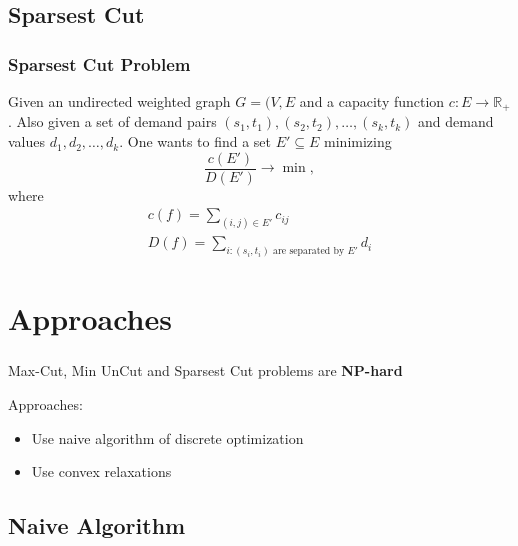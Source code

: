 \documentclass[10pt]{beamer}
\begin{document}
	\subsection{Sparsest Cut}
	
		\begin{frame}
			\frametitle{Sparsest Cut Problem}
			
			Given an undirected weighted graph $G = (V, E$ and a capacity function $c 
			: E \rightarrow \mathbb R_+$.
			Also given a set of demand pairs $(s_1, t_1), (s_2, t_2), \dots, (s_k, t_k)$ and 
			demand values $d_1, d_2, \dots, d_k$.
			One wants to find a set $E' \subseteq E$ minimizing
			\[
				\frac{c(E') }{ D(E') } \rightarrow \min,
			\]
			where
			\begin{gather*}
				c(f) = \sum\limits_{(i, j) \in E'} c_{ij} \\
				D(f) = \sum\limits_{i : (s_i, t_i) \text{ are separated by } E'} d_i
			\end{gather*}
			
		\end{frame}

\section{Approaches}

	\begin{frame}
		\frametitle{}
		
		\Large
		Max-Cut, Min UnCut and Sparsest Cut problems are {\bfseries NP-hard}
		
		\pause
		\vspace{0.5in}
		
		Approaches:
		\begin{itemize}
			\item Use naive algorithm of discrete optimization
			\item Use convex relaxations
		\end{itemize}
	\end{frame}

	\subsection{Naive Algorithm}
\end{document}
